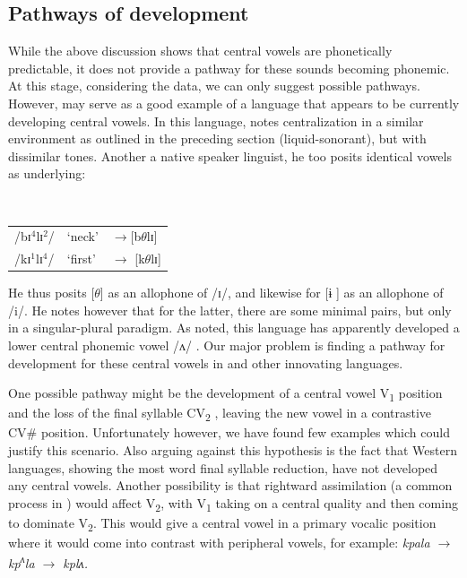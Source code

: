 \documentclass[output=paper
,newtxmath
,modfonts
,nonflat]{langsci/langscibook}
\begin{document}
\subsection{Pathways of development}\label{sec:zogbo:4.2} 

While the above discussion shows that central vowels are phonetically predictable, it does not provide a pathway for these sounds becoming phonemic.  At this stage, considering the data, we can only suggest possible pathways.  However,  may serve as a good example of a language that appears to be currently developing central vowels.  In this language, \citet[191]{Goprou2014} notes centralization in a similar environment as outlined in the preceding section (liquid-sonorant), but with dissimilar tones. Another a native speaker linguist, he too posits identical vowels as underlying:

\ea {}\\
\begin{tabular}{lll}
/bɪ$^4$lɪ$^2$/ & ‘neck’ & $\rightarrow$[b$\theta $lɪ]\\
/kɪ$^1$lɪ$^4$/ & ‘first’ & $\rightarrow$ [k$\theta $lɪ]\\
\end{tabular}
\z

He thus posits [$\theta $] as an allophone of /ɪ/, and likewise for [ɨ ] as an allophone of /i/.  He notes however that for the latter, there are some minimal pairs, but only in a singular-plural paradigm. As noted, this language has apparently developed a lower central phonemic vowel /ʌ/ \citep{Vahoua2011}. Our major problem is finding a pathway for development for these central vowels in  and other innovating languages. 

One possible pathway might be the development of a central vowel V\textsubscript{1} position and the loss of the final syllable CV\textsubscript{2} , leaving the new vowel in a contrastive CV\# position.  Unfortunately however, we have found few examples which could justify this scenario. Also arguing against this hypothesis is the fact that Western languages, showing the most word final syllable reduction, have not developed any central vowels.  Another possibility is that rightward assimilation (a common  process in ) would affect V\textsubscript{2}, with V\textsubscript{1} taking on a central quality and then coming to dominate V\textsubscript{2}. This would give a central vowel in a primary vocalic position where it would come into contrast with peripheral vowels, for example:  \textit{kpala $\rightarrow$  kp\textsuperscript{ʌ}}\textit{la $\rightarrow$ kplʌ.}
\end{document}
